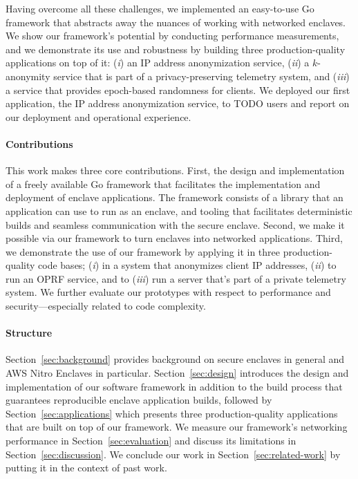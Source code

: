 Having overcome all these challenges, we implemented an easy-to-use Go framework that abstracts away the nuances of working with networked enclaves.  We show our framework's potential by conducting performance measurements, and we demonstrate its use and robustness by building three production-quality applications on top of it: (\emph{i}) an IP address anonymization service, (\emph{ii}) a $k$-anonymity service that is part of a privacy-preserving telemetry system, and (\emph{iii}) a service that provides epoch-based randomness for clients.  We deployed our first application, the IP address anonymization service, to TODO users and report on our deployment and operational experience.

\paragraph{Contributions}

This work makes three core contributions.  First, the design and implementation of a freely available Go framework that facilitates the implementation and deployment of enclave applications.  The framework consists of a library that an application can use to run as an enclave, and tooling that facilitates deterministic builds and seamless communication with the secure enclave.
%
Second, we make it possible via our framework to turn enclaves into networked applications.
%
Third, we demonstrate the use of our framework by applying it in three production-quality code bases; (\emph{i}) in a system that anonymizes client IP addresses, (\emph{ii}) to run an OPRF service, and to (\emph{iii}) run a server that's part of a private telemetry system.  We further evaluate our prototypes with respect to performance and security---especially related to code complexity.

\paragraph{Structure}

Section~\ref{sec:background} provides background on secure enclaves in general and AWS Nitro Enclaves in particular.  Section~\ref{sec:design} introduces the design and implementation of our software framework in addition to the build process that guarantees reproducible enclave application builds, followed by Section~\ref{sec:applications} which presents three production-quality applications that are built on top of our framework.  We measure our framework's networking performance in Section~\ref{sec:evaluation} and discuss its limitations in Section~\ref{sec:discussion}.  We conclude our work in Section~\ref{sec:related-work} by putting it in the context of past work.